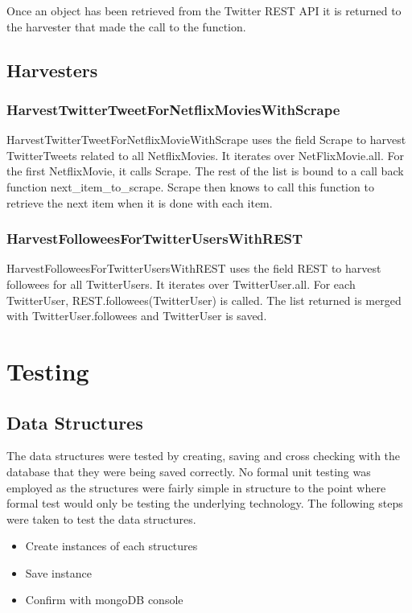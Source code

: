 Once an object has been retrieved from the Twitter REST API it is returned to the harvester that made the call to the function.

\subsection{Harvesters}
\subsubsection{HarvestTwitterTweetForNetflixMoviesWithScrape}
HarvestTwitterTweetForNetflixMovieWithScrape uses the field Scrape to harvest TwitterTweets related to all NetflixMovies. It iterates over NetFlixMovie.all. For the first NetflixMovie, it calls Scrape. The rest of the list is bound to a call back function next\_item\_to\_scrape. Scrape then knows to call this function to retrieve the next item when it is done with each item.

\subsubsection{HarvestFolloweesForTwitterUsersWithREST}
HarvestFolloweesForTwitterUsersWithREST uses the field REST to harvest followees for all TwitterUsers. It iterates over TwitterUser.all. For each TwitterUser, REST.followees(TwitterUser) is called. The list returned is merged with TwitterUser.followees and TwitterUser is saved.


\section{Testing}\label{impl:Testing}
\subsection{Data Structures}
The data structures were tested by creating, saving and cross checking with the database that they were being saved correctly. No formal unit testing was employed as the structures were fairly simple in structure to the point where formal test would only be testing the underlying technology. The following steps were taken to test the data structures.

	\begin{itemize}
	\item Create instances of each structures
	\item Save instance
	\item Confirm with mongoDB console
	\end{itemize}

